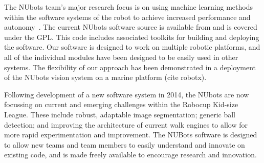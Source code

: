 \documentclass{llncs}
\begin{document}
The NUbots team's major research focus is on using machine learning methods within the software systems of the robot to achieve increased performance and autonomy~\cite{ChalupEtAlSMC2007}. The current NUbots software source is available from \cite{nubotsGit} and is covered under the GPL. This code includes associated toolkits for building and deploying the software. Our software is designed to work on multiple robotic platforms, and all of the individual modules have been designed to be easily used in other systems. The flexibility of our approach has been demonstrated in a deployment of the NUbots vision system on a marine platform (cite robotx). %

Following development of a new software system in 2014, the NUbots are now focussing on current and emerging challenges within the Robocup Kid-size League. These include robust, adaptable image segmentation; generic ball detection; and improving the architecture of current walk engines to allow for more rapid experimentation and improvement. The NUBots software is designed to allow new teams and team members to easily understand and innovate on existing code, and is made freely available to encourage research and innovation.



\end{document}
